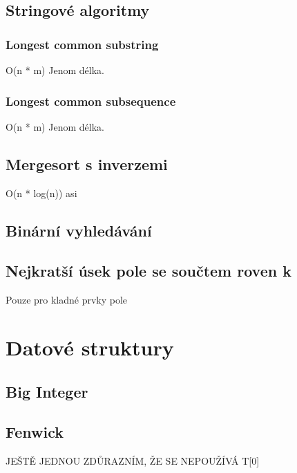 \documentclass{article}
\begin{document}
\subsection{Stringové algoritmy}
\subsubsection{Longest common substring}
O(n * m)
Jenom délka.


\subsubsection{Longest common subsequence}
O(n * m)
Jenom délka.


\subsection{Mergesort s inverzemi}
O(n * log(n)) asi


\subsection{Binární vyhledávání}


\subsection{Nejkratší úsek pole se součtem roven k}
Pouze pro kladné prvky pole


\newpage

\section{Datové struktury}

\subsection{Big Integer}


\subsection{Fenwick}
JEŠTĚ JEDNOU ZDŮRAZNÍM, ŽE SE NEPOUŽÍVÁ T[0]

\end{document}

